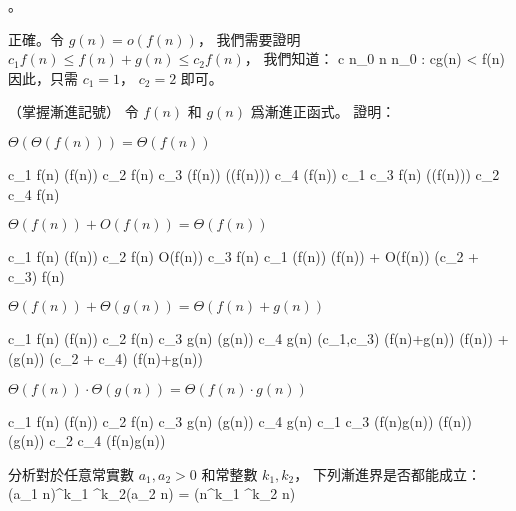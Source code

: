 \item {}。

\startANSWER
正確。令 $g(n) = o(f(n))$，
我們需要證明 $c_1 f(n) \le f(n) + g(n) \le c_2 f(n)$，
我們知道：
\startformula
\forall c \exists n_0 \forall n \geq n_0 : cg(n) < f(n)
\stopformula
因此，只需 $c_1 = 1$， $c_2 = 2$ 即可。
\stopANSWER

\stopigBase
\stopPROBLEM

\startPROBLEM
（掌握漸進記號）
令 $f(n)$ 和 $g(n)$ 爲漸進正函式。
證明：
\startigBase[a]

\startitem
$\Theta(\Theta(f(n))) = \Theta(f(n))$

\startANSWER
\startsplitformula\startmathalignment[n=3]
\NC c_1 f(n) \le \NC \Theta(f(n)) \NC \le c_2 f(n) \NR
\NC c_3 \Theta(f(n)) \le \NC \Theta(\Theta(f(n))) \NC \le c_4 \Theta(f(n)) \NR
\NC c_1 c_3 f(n) \le \NC \Theta(\Theta(f(n))) \NC \le c_2 c_4 f(n) \NR
\stopmathalignment\stopsplitformula
\stopANSWER
\stopitem

\startitem
$\Theta(f(n)) + O(f(n)) = \Theta(f(n))$

\startANSWER
\startsplitformula\startmathalignment[n=3]
\NC c_1 f(n) \le \NC \Theta(f(n)) \NC \le c_2 f(n) \NR
\NC \NC O(f(n)) \NC \le c_3 f(n) \NR
\NC c_1 \Theta(f(n)) \le \NC \Theta(f(n)) + O(f(n)) \NC \le (c_2 + c_3) f(n) \NR
\stopmathalignment\stopsplitformula
\stopANSWER
\stopitem

\startitem
$\Theta(f(n)) + \Theta(g(n)) = \Theta(f(n)+g(n))$

\startANSWER
\startsplitformula\startmathalignment[n=3]
\NC c_1 f(n) \le \NC \Theta(f(n)) \NC \le c_2 f(n) \NR
\NC c_3 g(n) \le \NC \Theta(g(n)) \NC \le c_4 g(n) \NR
\NC \min(c_1,c_3) (f(n)+g(n)) \le
	 \NC \Theta(f(n)) + \Theta(g(n))
	 \NC \le \max(c_2 + c_4) (f(n)+g(n)) \NR
\stopmathalignment\stopsplitformula
\stopANSWER
\stopitem

\startitem
$\Theta(f(n)) \cdot \Theta(g(n)) = \Theta(f(n) \cdot g(n))$

\startANSWER
\startsplitformula\startmathalignment[n=3]
\NC c_1 f(n) \le \NC \Theta(f(n)) \NC \le c_2 f(n) \NR
\NC c_3 g(n) \le \NC \Theta(g(n)) \NC \le c_4 g(n) \NR
\NC c_1 c_3 (f(n)\cdot g(n)) \le
	 \NC \Theta(f(n)) \cdot \Theta(g(n))
	 \NC \le c_2 c_4 (f(n)\cdot g(n)) \NR
\stopmathalignment\stopsplitformula
\stopANSWER
\stopitem

\startitem
分析對於任意常實數 $a_1,a_2 > 0$ 和常整數 $k_1,k_2$，
下列漸進界是否都能成立：
\startformula
(a_1 n)^{k_1} \lg^{k_2}(a_2 n) = \Theta(n^{k_1} \lg^{k_2} n)
\stopformula

